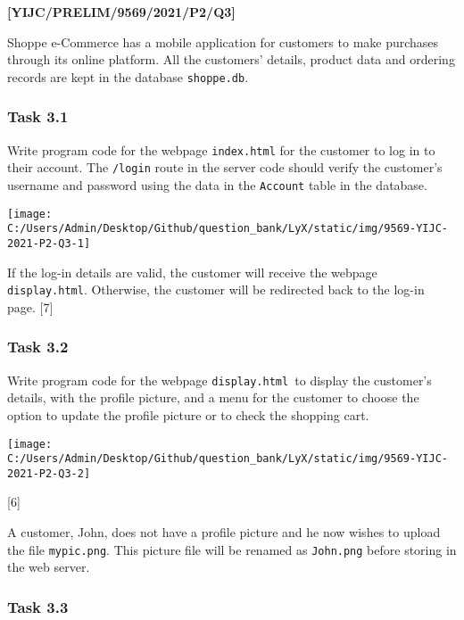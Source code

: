 \item \textbf{{[}YIJC/PRELIM/9569/2021/P2/Q3{]} }

Shoppe e-Commerce has a mobile application for customers to make purchases
through its online platform. All the customers\textquoteright{} details,
product data and ordering records are kept in the database \texttt{shoppe.db}. 

\subsubsection*{Task 3.1 }

Write program code for the webpage \texttt{index.html} for the customer
to log in to their account. The \texttt{/login} route in the server
code should verify the customer\textquoteright s username and password
using the data in the \texttt{Account} table in the database. 
\noindent \begin{center}
\texttt{[image: C:/Users/Admin/Desktop/Github/question\_bank/LyX/static/img/9569-YIJC-2021-P2-Q3-1]}
\par\end{center}

If the log-in details are valid, the customer will receive the webpage
\texttt{display.html}. Otherwise, the customer will be redirected
back to the log-in page. \hfill{} {[}7{]}

\subsubsection*{Task 3.2 }

Write program code for the webpage \texttt{display.html }to display
the customer\textquoteright s details, with the profile picture, and
a menu for the customer to choose the option to update the profile
picture or to check the shopping cart. 
\noindent \begin{center}
\texttt{[image: C:/Users/Admin/Desktop/Github/question\_bank/LyX/static/img/9569-YIJC-2021-P2-Q3-2]}
\par\end{center}

\hfill{} {[}6{]}

A customer, John, does not have a profile picture and he now wishes
to upload the file \texttt{mypic.png}. This picture file will be renamed
as \texttt{John.png} before storing in the web server. 

\subsubsection*{Task 3.3 }

